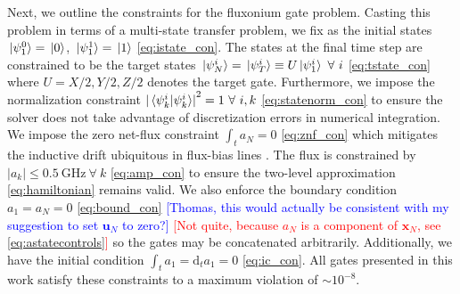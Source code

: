 Next, we outline the constraints for the fluxonium gate problem.
Casting this problem in terms of a multi-state transfer problem, we fix as the initial states
 $\ket*{\psi^{0}_{1}} = \ket*{0}$, $\ket*{\psi^{1}_{1}} = \ket*{1}$
\eqref{eq:istate_con}.
The states at the final time step are constrained to be
the target states $\ket*{\psi^{i}_{N}} = \ket*{\psi^{i}_{T}} \equiv
U \ket*{\psi^{i}_{1}} \ \forall \ i$
\eqref{eq:tstate_con} where $U = X/2, Y/2, Z/2$ denotes the target gate.
Furthermore, we impose the normalization constraint
${\lvert \braket*{\psi^{i}_{k}}{\psi^{i}_{k}} \rvert}^{2} = 1 \ \forall \ i,k$
\eqref{eq:statenorm_con}
to ensure the solver does not take advantage of discretization errors in numerical integration.
We impose the zero net-flux constraint $\int_{t} a_{N} = 0$
\eqref{eq:znf_con}
which mitigates the inductive drift ubiquitous in flux-bias lines
\cite{battistel2019fast, krantz2019quantum, zhang2020universal}.
The flux is constrained by $\lvert a_{k} \rvert \leq 0.5 \ \textrm{GHz} \ \forall \ k$
\eqref{eq:amp_con} to ensure the two-level approximation
\eqref{eq:hamiltonian} remains valid.
We also enforce the boundary condition $a_{1} = a_{N} = 0$ \eqref{eq:bound_con}
\textcolor{blue}{[Thomas, this would actually be consistent with
    my suggestion to set $\mathbf{u}_N$ to zero?]}
\textcolor{red}{[Not quite, because $a_{N}$ is a component of $\mathbf{x}_{N}$,
    see \eqref{eq:astatecontrols}]}
so the gates may be concatenated arbitrarily. Additionally,
we have the initial condition $\int_{t} a_{1} = \mathrm{d}_{t} a_{1} = 0$
\eqref{eq:ic_con}. All gates presented in this work satisfy these constraints to
a maximum violation of $\sim 10^{-8}$.

